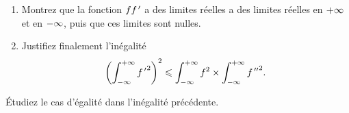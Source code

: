 \begin{q}
\begin{enumerate}
    \item Montrez que la fonction \(ff^{\,\prime}\) a des limites réelles a des limites réelles en \(+\infty\) et en \(-\infty\), puis que ces limites sont nulles. \\
    \item Justifiez finalement l'inégalité \[\left(\int_{-\infty}^{+\infty}{f^{\,\prime}}^2\right)^2\leqslant\int_{-\infty}^{+\infty}f^2\times\int_{-\infty}^{+\infty}{f^{\,\prime\prime}}^2.\]
\end{enumerate}
\end{q}

\begin{q}
Étudiez le cas d'égalité dans l'inégalité précédente.
\end{q}
